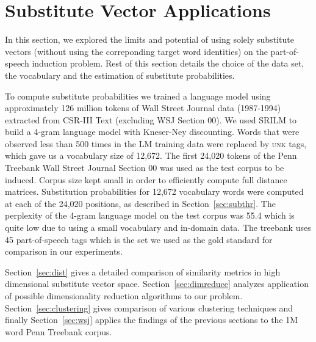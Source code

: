 \section{Substitute Vector Applications}
\label{sec:subapp}
In this section, we explored the limits and potential of using solely
substitute vectors (without using the correponding target word
identities) on the part-of-speech induction problem.  Rest of this
section details the choice of the data set, the vocabulary and the
estimation of substitute probabilities.  

To compute substitute probabilities we trained a language model using
approximately 126 million tokens of Wall Street Journal data
(1987-1994) extracted from CSR-III Text \cite{csr3text} (excluding WSJ
Section 00).
We used SRILM \cite{Stolcke2002} to build a 4-gram language model with
Kneser-Ney discounting.
Words that were observed less than 500 times in the LM training data
were replaced by \textsc{unk} tags, which gave us a vocabulary size of
12,672.
The first 24,020 tokens of the Penn Treebank \cite{treebank3} Wall
Street Journal Section 00 was used as the test corpus to be induced.
Corpus size kept small in order to efficiently compute full distance
matrices.  Substitution probabilities for 12,672 vocabulary words were
computed at each of the 24,020 positions, as described in
Section~\ref{sec:subthr}.
The perplexity of the 4-gram language model on the test corpus was
55.4 which is quite low due to using a small
vocabulary and in-domain data.
The treebank uses 45 part-of-speech tags which is the set we used as
the gold standard for comparison in our experiments.

Section~\ref{sec:dist} gives a detailed comparison of similarity
metrics in high dimensional substitute vector space.
Section~\ref{sec:dimreduce} analyzes application of possible
dimensionality reduction algorithms to our problem.
Section~\ref{sec:clustering} gives comparison of various clustering
techniques and finally Section~\ref{sec:wsj} applies the findings of
the previous sections to the 1M word Penn Treebank corpus.
